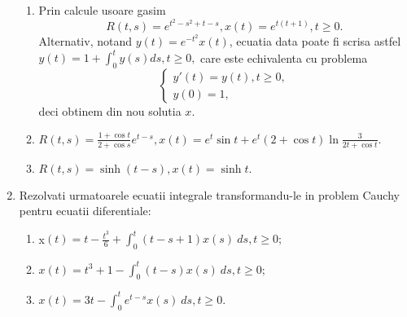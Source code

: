 \documentclass[a4paper,12pt,oneside]{report}
\begin{document}
\begin{enumerate}
		      	\begin{enumerate}[label=(\alph*)]
		      		\item Prin calcule usoare gasim 
		      		      \begin{displaymath}
		      		      	R \left ( t,s \right ) = e^{t^{2}- s^{2} + t - s }, x\left ( t \right ) = e^{t\left ( t+1 \right )}, t\geq 0. 
		      		      \end{displaymath}
		      		      Alternativ, notand \(y\left ( t \right ) = e^{-t^{2}}x\left ( t \right ) \), ecuatia data poate fi scrisa astfel 
		      		      \(y\left ( t \right ) = 1 + \int_{0}^{t} y\left ( s \right )ds, t\geq 0,\)
		      		      care este echivalenta cu problema 
		      		      \begin{displaymath}
		      		      	\left\{\begin{matrix}
		      		      	{y}'\left ( t \right ) = y\left ( t \right ), t\geq 0, \\ 
		      		      	y\left ( 0 \right ) = 1,
		      		      	\end{matrix}\right.
		      		      \end{displaymath}
		      		      deci obtinem din nou solutia \(x\).  
		      		      		      		      		      		      		      		      		      		      
		      		      		      		      		      		      		      		      		      		      
		      		\item \(R\left ( t,s \right ) = \frac{1+ \cos t}{2+ \cos s}e^{t-s},
		      		      x\left ( t \right ) = e^{t}\sin t+ e^{t}\left ( 2+ \cos t \right ) \ln \frac{3}{2t + \cos t}.\)
		      		      		      		      		      		      		      		      		      		      
		      		\item \(R\left ( t,s \right ) = \sinh \left ( t-s \right ), x\left ( t \right ) = \sinh t.\)
		      		      		      		      		      		      		      		      		      		      
		      	\end{enumerate}
		      			      			      			      			      	    
		      	\item Rezolvati urmatoarele ecuatii integrale transformandu-le in problem Cauchy pentru ecuatii diferentiale:
		      	\begin{enumerate}[label=(\alph*)]
		      		\item x\(\left ( t \right ) =  t - \frac{t^{3}}{6} + \int_{0}^{t}\left ( t-s+1 \right )x\left ( s \right ) \ ds , t\geq 0;\)
		      		\item \(x\left ( t \right ) =  t^{3} + 1 - \int_{0}^{t}\left ( t-s \right )x\left ( s \right ) \ ds , t\geq 0;\)
		      		\item \(x\left ( t \right ) =  3t - \int_{0}^{t}e^{t-s}x\left ( s \right ) \ ds , t\geq 0.\)
		      	\end{enumerate}
		      			      			      			      			      	        

\end{enumerate}
\end{document}
